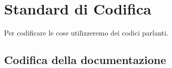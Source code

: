 \chapter{Standard di Codifica}
Per codificare le cose utilizzeremo dei codici parlanti.

\section{Codifica della documentazione}

